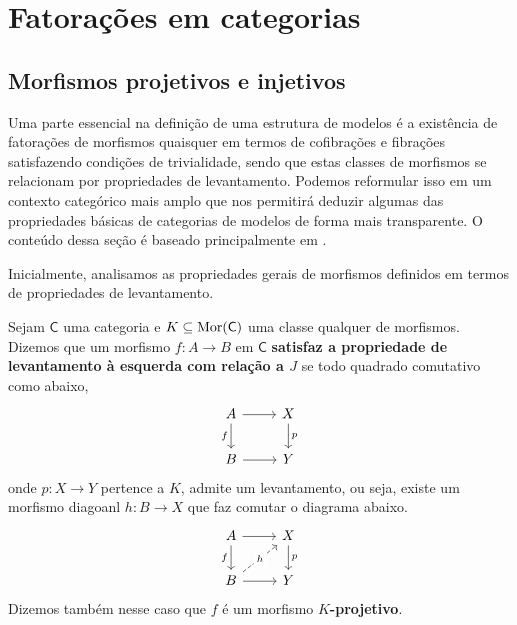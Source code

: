 \section{Fatorações em categorias}

\subsection{Morfismos projetivos e injetivos}

Uma parte essencial na definição de uma estrutura de modelos é a existência de fatorações de morfismos quaisquer em termos de cofibrações e fibrações satisfazendo condições de trivialidade, sendo que estas classes de morfismos se relacionam por propriedades de levantamento.
Podemos reformular isso em um contexto categórico mais amplo que nos permitirá deduzir algumas das propriedades básicas de categorias de modelos de forma mais transparente.
O conteúdo dessa seção é baseado principalmente em \cite{nlab:injective_or_projective_morphism}.

Inicialmente, analisamos as propriedades gerais de morfismos definidos em termos de propriedades de levantamento.

\begin{defin}\label{defin:morfismo_proj}
  Sejam $\mathsf{C}$ uma categoria e $K \subseteq \mathrm{Mor}(\mathsf{C})$ uma classe qualquer de morfismos.
  Dizemos que um morfismo $f: A \to B$ em $\mathsf{C}$ \textbf{satisfaz a propriedade de levantamento à esquerda com relação a $J$} se todo quadrado comutativo como abaixo,
  \begin{displaymath}
    \begin{tikzcd}
      A
      \arrow[r]
      \arrow[d, "f" swap]
      & X
      \arrow[d, "p"]
      \\ B
      \arrow[r]
      & Y
    \end{tikzcd}
  \end{displaymath}
  onde $p: X \to Y$ pertence a $K$, admite um levantamento, ou seja, existe um morfismo diagoanl $h: B \to X$ que faz comutar o diagrama abaixo.
  \begin{displaymath}
    \begin{tikzcd}
      A
      \arrow[r]
      \arrow[d, "f" swap]
      & X
      \arrow[d, "p"]
      \\ B
      \arrow[r]
      \arrow[ru, dashed, "h" description]
      & Y
    \end{tikzcd}
  \end{displaymath}
  Dizemos também nesse caso que $f$ é um morfismo \textbf{$K$-projetivo}.
\end{defin}

